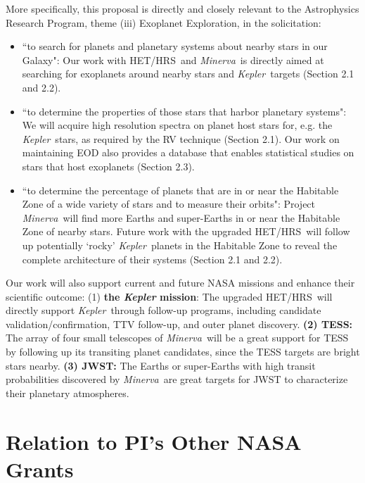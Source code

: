 \documentclass[12pt]{article}
\def\kepler{{\it Kepler}}
\def\minerva{{\it Minerva}}
\def\hrs{HET/HRS}
\begin{document}
More specifically, this proposal is directly and closely relevant to
the Astrophysics Research Program, theme (iii) Exoplanet Exploration,
in the solicitation:
\begin{itemize}[leftmargin=1.5em]
  \vspace{-3pt}
\item ``to search for planets and planetary systems about
  nearby stars in our Galaxy": Our work with \hrs\ and
  \minerva\ is directly aimed at searching for exoplanets
  around nearby stars and \kepler\ targets (Section 2.1
  and 2.2).
  \vspace{-3pt}
\item ``to determine the properties of those stars that harbor
  planetary systems": We will acquire high resolution spectra
  on planet host stars for, e.g. the \kepler\ stars, as
  required by the RV technique (Section 2.1). Our work on
  maintaining EOD also provides a database that enables
  statistical studies on stars that host exoplanets (Section
  2.3).
  \vspace{-3pt}
\item ``to determine the percentage of planets that are in or near the
  Habitable Zone of a wide variety of stars and to measure their
  orbits": Project \minerva\ will find more Earths and super-Earths in
  or near the Habitable Zone of nearby stars. Future work with the
  upgraded \hrs\ will follow up potentially `rocky' \kepler\ planets
  in the Habitable Zone to reveal the complete architecture of their
  systems (Section 2.1 and 2.2).
  \vspace{-3pt}
\end{itemize}

Our work will also support current and future NASA missions and
enhance their scientific outcome: (1) {\bf the \textit{Kepler}
  mission}: The upgraded \hrs\ will directly support \kepler\ through
follow-up programs, including candidate validation/confirmation, TTV
follow-up, and outer planet discovery. {\bf (2) TESS:} The array of
four small telescopes of \minerva\ will be a great support for TESS by
following up its transiting planet candidates, since the TESS targets
are bright stars nearby. {\bf (3) JWST:} The Earths or super-Earths
with high transit probabilities discovered by \minerva\ are great
targets for JWST to characterize their planetary atmospheres.


\vspace{-3pt}
\section{Relation to PI's Other NASA Grants}
\end{document}
